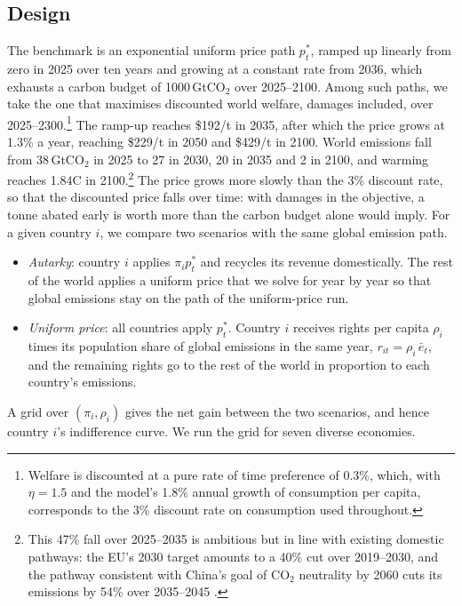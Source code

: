 \documentclass[12pt,english]{article}
\theoremstyle{remark}
\begin{document}
\subsection{Design}

The benchmark is an exponential uniform price path $p^*_t$, ramped up linearly from zero in 2025 over ten years and growing at a constant rate from 2036, which exhausts a carbon budget of 1000\,GtCO$_2$ over 2025--2100. Among such paths, we take the one that maximises discounted world welfare, damages included, over 2025--2300.\footnote{Welfare is discounted at a pure rate of time preference of 0.3\%, which, with $\eta=1.5$ and the model's 1.8\% annual growth of consumption per capita, corresponds to the 3\% discount rate on consumption used throughout.} The ramp-up reaches \$192/t in 2035, after which the price grows at 1.3\% a year, reaching \$229/t in 2050 and \$429/t in 2100. World emissions fall from 38\,GtCO$_2$ in 2025 to 27 in 2030, 20 in 2035 and 2 in 2100, and warming reaches 1.84\textdegree C in 2100.\footnote{This 47\% fall over 2025--2035 is ambitious but in line with existing domestic pathways: the EU's 2030 target amounts to a 40\% cut over 2019--2030, and the pathway consistent with China's goal of CO$_2$ neutrality by 2060 cuts its emissions by 54\% over 2035--2045 \citep{du_toward_2026}.}
The price grows more slowly than the 3\% discount rate, so that the discounted price falls over time: with damages in the objective, a tonne abated early is worth more than the carbon budget alone would imply.
For a given country $i$, we compare two scenarios with the same global emission path.

\begin{itemize}
  \item \emph{Autarky}: country $i$ applies $\pi_i p^*_t$ and recycles its revenue domestically. The rest of the world applies a uniform price that we solve for year by year so that global emissions stay on the path of the uniform-price run.
  \item \emph{Uniform price}: all countries apply $p^*_t$. Country $i$ receives rights per capita $\rho_i$ times its population share of global emissions in the same year, $r_{it}=\rho_i\,\bar e_t$,
  and the remaining rights go to the rest of the world in proportion to each country's emissions.
\end{itemize}

A grid over $(\pi_i,\rho_i)$ gives the net gain
between the two scenarios,
and hence country $i$'s indifference curve. We run the grid for seven diverse economies.
\end{document}
